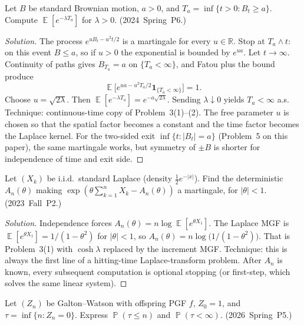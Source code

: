 \documentclass[11pt,a4paper]{article}
\DeclareMathOperator{\E}{\mathbb{E}}
\DeclareMathOperator{\Pbb}{\mathbb{P}}
\begin{document}
\begin{example}
\label{ex:stop-bm-laplace}
Let \( B \) be standard Brownian motion, \( a>0 \), and \( T_a=\inf\{t>0:B_t\ge a\} \). Compute \( \E[e^{-\lambda T_a}] \) for \( \lambda>0 \). (2024~Spring~P6.)
\end{example}

\begin{proof}[Solution]
The process \( e^{uB_t-u^{2}t/2} \) is a martingale for every \( u\in\mathbb{R} \). Stop at \( T_a\wedge t \): on this event \( B\le a \), so if \( u>0 \) the exponential is bounded by \( e^{ua} \). Let \( t\to\infty \). Continuity of paths gives \( B_{T_a}=a \) on \( \{T_a<\infty\} \), and Fatou plus the bound produce
\[
\E\bigl[e^{ua-u^{2}T_a/2}\mathbf{1}_{\{T_a<\infty\}}\bigr]
=
1.
\]
Choose \( u=\sqrt{2\lambda} \). Then \( \E[e^{-\lambda T_a}]=e^{-a\sqrt{2\lambda}} \). Sending \( \lambda\downarrow 0 \) yields \( T_a<\infty \) a.s. Technique: continuous-time copy of Problem~3(1)--(2). The free parameter \( u \) is chosen so that the spatial factor becomes a constant and the time factor becomes the Laplace kernel. For the two-sided exit \( \inf\{t:|B_t|=a\} \) (Problem~5 on this paper), the same martingale works, but symmetry of \( \pm B \) is shorter for independence of time and exit side.
\end{proof}

\begin{example}
\label{ex:stop-write-mgf}
Let \( (X_k) \) be i.i.d.\ standard Laplace (density \( \tfrac12 e^{-|x|} \)). Find the deterministic \( A_n(\theta) \) making \( \exp(\theta\sum_{k=1}^{n}X_k-A_n(\theta)) \) a martingale, for \( |\theta|<1 \). (2023~Fall~P2.)
\end{example}

\begin{proof}[Solution]
Independence forces \( A_n(\theta)=n\log\E[e^{\theta X_1}] \). The Laplace MGF is \( \E[e^{\theta X_1}]=1/(1-\theta^{2}) \) for \( |\theta|<1 \), so \( A_n(\theta)=n\log\bigl(1/(1-\theta^{2})\bigr) \). That is Problem~3(1) with \( \cosh\lambda \) replaced by the increment MGF. Technique: this is always the first line of a hitting-time Laplace-transform problem. After \( A_n \) is known, every subsequent computation is optional stopping (or first-step, which solves the same linear system).
\end{proof}

\begin{example}
\label{ex:stop-branching}
Let \( (Z_n) \) be Galton--Watson with offspring PGF \( f \), \( Z_0=1 \), and \( \tau=\inf\{n:Z_n=0\} \). Express \( \Pbb(\tau\le n) \) and \( \Pbb(\tau<\infty) \). (2026~Spring~P5.)
\end{example}
\end{document}
